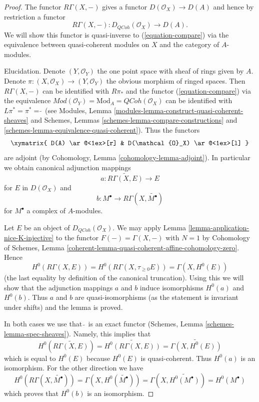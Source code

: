 \documentclass{stacks-project}
\theoremstyle{plain}
\theoremstyle{definition}
\theoremstyle{remark}
\numberwithin{equation}{subsection}
\def\QCoh{\mathit{QCoh}}
\begin{document}
\begin{proof}
The functor $R\Gamma(X, -)$ gives a functor
$D(\mathcal{O}_X) \to D(A)$ and hence by restriction a functor
\begin{equation}
\label{equation-back}
R\Gamma(X, -) : D_\QCoh(\mathcal{O}_X) \longrightarrow D(A).
\end{equation}
We will show this functor is quasi-inverse to (\ref{equation-compare})
via the equivalence between quasi-coherent modules on $X$ and
the category of $A$-modules.

\medskip\noindent
Elucidation. Denote $(Y, \mathcal{O}_Y)$ the one point space with sheaf
of rings given by $A$. Denote
$\pi : (X, \mathcal{O}_X) \to (Y, \mathcal{O}_Y)$
the obvious morphism of ringed spaces.
Then $R\Gamma(X, -)$ can be identified with $R\pi_*$ and the functor
(\ref{equation-compare}) via the equivalence
$\textit{Mod}(\mathcal{O}_Y) = \text{Mod}_A = \QCoh(\mathcal{O}_X)$
can be identified with $L\pi^* = \pi^* = \widetilde{\ }$ (see
Modules, Lemma \ref{modules-lemma-construct-quasi-coherent-sheaves} and
Schemes, Lemmas \ref{schemes-lemma-compare-constructions} and
\ref{schemes-lemma-equivalence-quasi-coherent}). Thus the functors
$$
\xymatrix{
D(A) \ar@<1ex>[r] & D(\mathcal{O}_X) \ar@<1ex>[l]
}
$$
are adjoint (by Cohomology, Lemma \ref{cohomology-lemma-adjoint}). In
particular we obtain canonical adjunction mappings
$$
a : \widetilde{R\Gamma(X, E)} \longrightarrow E
$$
for $E$ in $D(\mathcal{O}_X)$ and
$$
b : M^\bullet \longrightarrow R\Gamma(X, \widetilde{M^\bullet})
$$
for $M^\bullet$ a complex of $A$-modules.

\medskip\noindent
Let $E$ be an object of $D_\QCoh(\mathcal{O}_X)$. We may apply
Lemma \ref{lemma-application-nice-K-injective}
to the functor $F(-) = \Gamma(X, -)$
with $N = 1$ by Cohomology of Schemes, Lemma
\ref{coherent-lemma-quasi-coherent-affine-cohomology-zero}.
Hence
$$
H^0(R\Gamma(X, E)) = H^0(R\Gamma(X, \tau_{\geq 0}E)) = \Gamma(X, H^0(E))
$$
(the last equality by definition of the canonical truncation).
Using this we will show that the adjunction mappings $a$ and $b$
induce isomorphisms $H^0(a)$ and $H^0(b)$. Thus $a$ and $b$
are quasi-isomorphisms (as the statement is invariant under shifts)
and the lemma is proved.

\medskip\noindent
In both cases we use that $\widetilde{\ }$ is an exact functor
(Schemes, Lemma \ref{schemes-lemma-spec-sheaves}). Namely, this
implies that
$$
H^0\left(\widetilde{R\Gamma(X, E)}\right) =
\widetilde{H^0(R\Gamma(X, E))} =
\widetilde{\Gamma(X, H^0(E))}
$$
which is equal to $H^0(E)$ because $H^0(E)$ is quasi-coherent. Thus
$H^0(a)$ is an isomorphism. For the other direction we have
$$
H^0(R\Gamma(X, \widetilde{M^\bullet})) =
\Gamma(X, H^0(\widetilde{M^\bullet})) =
\Gamma(X, \widetilde{H^0(M^\bullet)}) =
H^0(M^\bullet)
$$
which proves that $H^0(b)$ is an isomorphism.
\end{proof}
\end{document}

